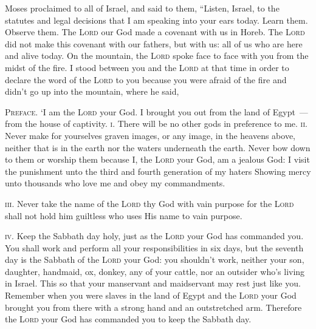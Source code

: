 
\begin{inparaenum}
   Moses proclaimed to all of Israel, and said to them, ``Listen, Israel, to the statutes and legal decisions that I am speaking into your ears today. Learn them. Observe them.%
   The \textsc{Lord} our God made a covenant with us in Horeb.%
   The \textsc{Lord} did not make this covenant with our fathers, but with us: all of us who are here and alive today.%
   On the mountain, the \textsc{Lord} spoke face to face with you from the midst of the fire.%
   I stood between you and the \textsc{Lord} at that time in order to declare the word of the \textsc{Lord} to you because you were afraid of the fire and didn't go up into the mountain, where he said,%
  
   \textsc{Preface.} `I am the \textsc{Lord} your God. I brought you out from the land of Egypt~--- from the house of captivity.%
   \textsc{i.} There will be no other gods in preference to me.%
   \textsc{ii.} Never make for yourselves graven images, or any image, in the heavens above, neither that is in the earth nor the waters underneath the earth.%
   Never bow down to them or worship them because I, the \textsc{Lord} your God, am a jealous God: I visit the punishment unto the third and fourth generation of my haters%
   Showing mercy unto thousands who love me and obey my commandments.%
  
   \textsc{iii.} Never take the name of the \textsc{Lord} thy God with vain purpose for the \textsc{Lord} shall not hold him guiltless who uses His name to vain purpose.%
  
   \textsc{iv.} Keep the Sabbath day holy, just as the \textsc{Lord} your God has commanded you.%
   You shall work and perform all your responsibilities in six days,%
   but the seventh day is the Sabbath of the \textsc{Lord} your God: you shouldn't work, neither your son, daughter, handmaid, ox, donkey, any of your cattle, nor an outsider who's living in Israel. This so that your manservant and maidservant may rest just like you.%
   Remember when you were slaves in the land of Egypt and the \textsc{Lord} your God brought you from there with a strong hand and an outstretched arm. Therefore the \textsc{Lord} your God has commanded you to keep the Sabbath day.%
  

\end{inparaenum}
